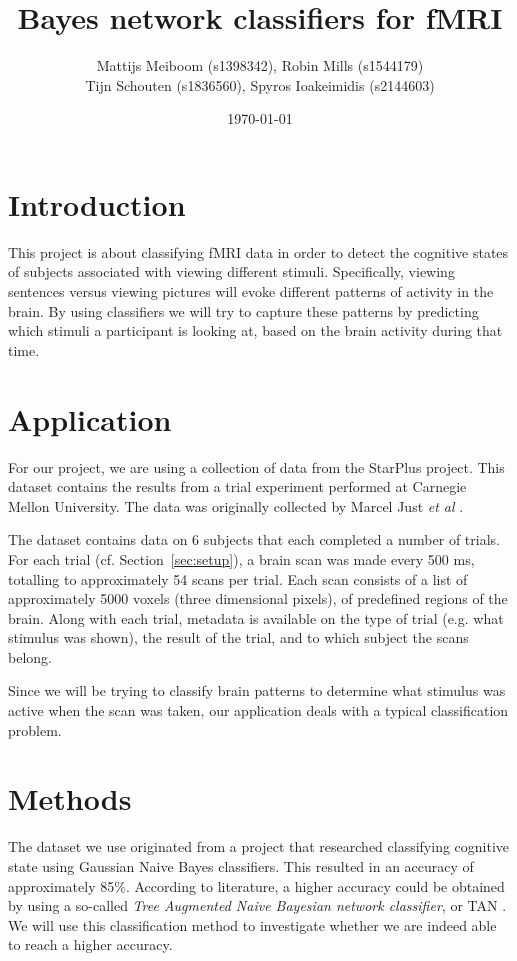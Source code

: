 \documentclass[a4paper, 11pt]{scrartcl}
\title{\Large Bayes network classifiers for fMRI}
\author{\small Mattijs Meiboom (s1398342), Robin Mills (s1544179)\\
			\small Tijn Schouten (s1836560), Spyros Ioakeimidis (s2144603)}
\date{\small \today}
\begin{document}
\maketitle

\thispagestyle{empty}

\section{Introduction}

This project is about classifying fMRI data in order to detect the cognitive states of subjects associated with viewing different stimuli. Specifically, viewing sentences versus viewing pictures will evoke different patterns of activity in the brain. By using classifiers we will try to capture these patterns by predicting which stimuli a participant is looking at, based on the brain activity during that time.

\section{Application}
\label{sec:application}

For our project, we are using a collection of data from the StarPlus project. This dataset contains the results from a trial experiment performed at Carnegie Mellon University. The data was originally collected by Marcel Just \textit{et al} \cite{StarPlus:2004kx}.

The dataset contains data on 6 subjects that each completed a number of trials. For each trial (cf. Section~\ref{sec:setup}), a brain scan was made every 500 ms, totalling to approximately 54 scans per trial. Each scan consists of a list of approximately 5000 voxels (three dimensional pixels), of predefined regions of the brain. Along with each trial, metadata is available on the type of trial (e.g. what stimulus was shown), the result of the trial, and to which subject the scans belong.

Since we will be trying to classify brain patterns to determine what stimulus was active when the scan was taken, our application deals with a typical classification problem.

\section{Methods}
\label{sec:methods}

The dataset we use originated from a project that researched classifying cognitive state using Gaussian Naive Bayes classifiers. This resulted in an accuracy of approximately 85\%. According to literature, a higher accuracy could be obtained by using a so-called \textit{Tree Augmented Naive Bayesian network classifier}, or TAN \cite{Friedman:1997gw}. We will use this classification method to investigate whether we are indeed able to reach a higher accuracy.
\end{document}
